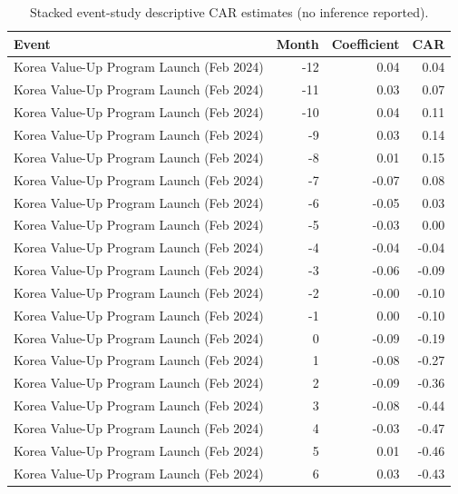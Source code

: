 \begin{table}
\caption{Stacked event-study descriptive CAR estimates (no inference reported).}
\label{tab:event_study_coefs}
\begin{tabular}{lrrr}
\toprule
Event & Month & Coefficient & CAR \\
\midrule
Korea Value-Up Program Launch (Feb 2024) & -12 & 0.04 & 0.04 \\
Korea Value-Up Program Launch (Feb 2024) & -11 & 0.03 & 0.07 \\
Korea Value-Up Program Launch (Feb 2024) & -10 & 0.04 & 0.11 \\
Korea Value-Up Program Launch (Feb 2024) & -9 & 0.03 & 0.14 \\
Korea Value-Up Program Launch (Feb 2024) & -8 & 0.01 & 0.15 \\
Korea Value-Up Program Launch (Feb 2024) & -7 & -0.07 & 0.08 \\
Korea Value-Up Program Launch (Feb 2024) & -6 & -0.05 & 0.03 \\
Korea Value-Up Program Launch (Feb 2024) & -5 & -0.03 & 0.00 \\
Korea Value-Up Program Launch (Feb 2024) & -4 & -0.04 & -0.04 \\
Korea Value-Up Program Launch (Feb 2024) & -3 & -0.06 & -0.09 \\
Korea Value-Up Program Launch (Feb 2024) & -2 & -0.00 & -0.10 \\
Korea Value-Up Program Launch (Feb 2024) & -1 & 0.00 & -0.10 \\
Korea Value-Up Program Launch (Feb 2024) & 0 & -0.09 & -0.19 \\
Korea Value-Up Program Launch (Feb 2024) & 1 & -0.08 & -0.27 \\
Korea Value-Up Program Launch (Feb 2024) & 2 & -0.09 & -0.36 \\
Korea Value-Up Program Launch (Feb 2024) & 3 & -0.08 & -0.44 \\
Korea Value-Up Program Launch (Feb 2024) & 4 & -0.03 & -0.47 \\
Korea Value-Up Program Launch (Feb 2024) & 5 & 0.01 & -0.46 \\
Korea Value-Up Program Launch (Feb 2024) & 6 & 0.03 & -0.43 \\

\end{tabular}
\end{table}
